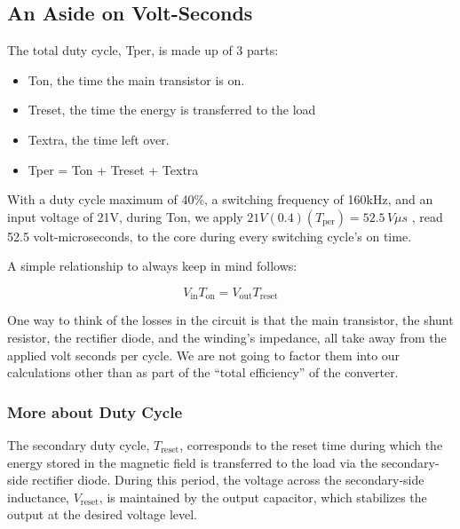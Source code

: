 \documentclass{article}
\begin{document}
\subsection{An Aside on Volt-Seconds}

The total duty cycle, Tper, is made up of 3 parts:
\begin{itemize}
    \item Ton, the time the main transistor is on.
    \item Treset, the time the energy is transferred to the load
    \item Textra, the time left over.
    \item Tper = Ton + Treset + Textra
\end{itemize}

With a duty cycle maximum of 40\%, a switching frequency of 160kHz, and an input voltage
of 21V, during Ton, we apply $21V(0.4)(T_{\text{per}}) = 52.5\, V\mu s$ , read 52.5 
volt-microseconds, to the core during every switching cycle’s on time.

A simple relationship to always keep in mind follows:

\begin{equation}
    V_{\text{in}} T_{\text{on}} = V_{\text{out}} T_{\text{reset}}
    \label{eq:voltseconds1}
\end{equation}

One way to think of the losses in the circuit is that the main transistor, the shunt
resistor, the rectifier diode, and the winding’s impedance, all take away from the
applied volt seconds per cycle.  We are not going to factor them into our calculations
other than as part of the “total efficiency” of the converter.

\subsubsection{More about Duty Cycle}

The secondary duty cycle, $T_{\text{reset}}$, corresponds to the reset time during which the energy stored in the magnetic field is transferred to the load via the secondary-side rectifier diode. During this period, the voltage across the secondary-side inductance, $V_{\text{reset}}$, is maintained by the output capacitor, which stabilizes the output at the desired voltage level.

\end{document}
